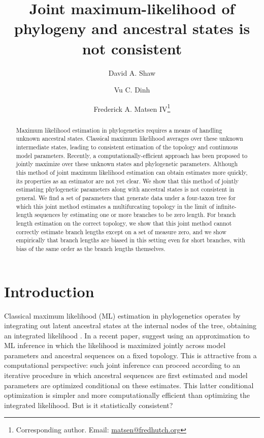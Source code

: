 \documentclass[11pt]{article}
\title{Joint maximum-likelihood of phylogeny and ancestral states is not consistent}
\author[1]{David A. Shaw}
\author[2]{Vu C. Dinh}
\author[1]{Frederick A. Matsen IV\thanks{Corresponding author. Email: \url{matsen@fredhutch.org}}}
\affil[1]{Computational Biology Program, Fred Hutchinson Cancer Research Center\\ Seattle, WA, USA}
\affil[2]{Department of Mathematical Sciences, University of Delaware\\ Newark, DE, USA}
\date{}
\begin{document}
\renewcommand{\arraystretch}{1.2} %

\maketitle

\begin{abstract}
Maximum likelihood estimation in phylogenetics requires a means of handling unknown ancestral states.
Classical maximum likelihood averages over these unknown intermediate states, leading to consistent estimation of the topology and continuous model parameters.
Recently, a computationally-efficient approach has been proposed to jointly maximize over these unknown states and phylogenetic parameters.
Although this method of joint maximum likelihood estimation can obtain estimates more quickly, its properties as an estimator are not yet clear.
We show that this method of jointly estimating phylogenetic parameters along with ancestral states is not consistent in general.
We find a set of parameters that generate data under a four-taxon tree for which this joint method estimates a multifurcating topology in the limit of infinite-length sequences by estimating one or more branches to be zero length.
For branch length estimation on the correct topology, we show that this joint method cannot correctly estimate branch lengths except on a set of measure zero, and we show empirically that branch lengths are biased in this setting even for short branches, with bias of the same order as the branch lengths themselves.
\end{abstract}

\newpage

\section*{Introduction}

Classical maximum likelihood (ML) estimation in phylogenetics operates by integrating out latent ancestral states at the internal nodes of the tree, obtaining an integrated likelihood \citep{Goldman1990-dk}.
In a recent paper, \citet{Sagulenko2018-xl} suggest using an approximation to ML inference in which the likelihood is maximized jointly across model parameters and ancestral sequences on a fixed topology.
This is attractive from a computational perspective: such joint inference can proceed according to an iterative procedure in which ancestral sequences are first estimated and model parameters are optimized conditional on these estimates.
This latter conditional optimization is simpler and more computationally efficient than optimizing the integrated likelihood.
But is it statistically consistent?
\end{document}
